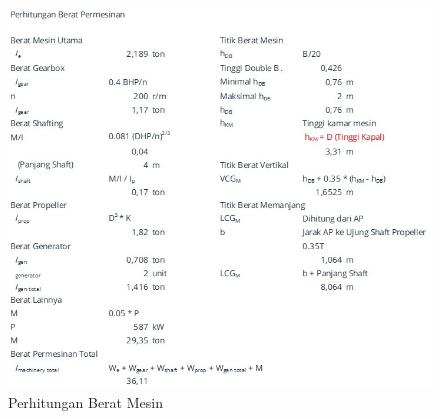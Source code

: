 \begin{figure}[!ht]
    \centering
    \includegraphics[width=\linewidth,keepaspectratio]{lampiran/deskap-5.jpg}
    \caption*{Perhitungan Berat Mesin}
\end{figure}

